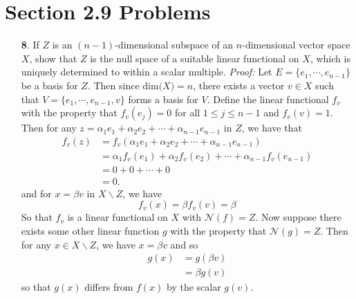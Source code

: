 \documentclass{article}
\begin{document}
\section*{Section 2.9 Problems}
\begin{itemize}
    \item[\textbf{8}.] If $Z$ is an $(n-1)$-dimensional subspace of an $n$-dimensional vector space $X$, show that $Z$ is the null space of a suitable linear functional on $X$, which is uniquely determined to within a scalar multiple.
    \newline\newline
    \textit{Proof:} Let $E = \{e_1,\cdots,e_{n-1}\}$ be a basis for $Z$. Then since $\text{dim(}X\text{)} = n$, there exists a vector $v \in X$ such that $V = \{e_1, \cdots, e_{n-1}, v\}$ forms a basis for $V$. Define the linear functional $f_v$ with the property that $f_v(e_j) = 0$ for all $1 \leq j \leq n-1$ and $f_v(v) = 1$. Then for any $z = \alpha_1e_1 + \alpha_2e_2 + \cdots + \alpha_{n-1}e_{n-1}$ in $Z$, we have that 
    \begin{align*}
        f_v(z) &= f_v(\alpha_1e_1 + \alpha_2e_2 + \cdots + \alpha_{n-1}e_{n-1})\\
        &= \alpha_1f_v(e_1) + \alpha_2f_v(e_2) + \cdots + \alpha_{n-1}f_v(e_{n-1})\\
        &= 0 + 0 + \cdots + 0\\
        &= 0.
    \end{align*}
    and for $x = \beta v$ in $X\backslash Z$, we have
    \[f_v(x) = \beta f_v(v) = \beta\]
    So that $f_v$ is a linear functional on $X$ with $\mathcal{N}(f) = Z$. Now suppose there exists some other linear function $g$ with the property that $\mathcal{N}(g) = Z$. Then for any $x \in X\backslash Z$, we have $x = \beta v$ and so
    \begin{align*}
        g(x) &= g(\beta v)\\
        &= \beta g(v)
    \end{align*}
    so that $g(x)$ differs from $f(x)$ by the scalar $g(v)$.



\end{itemize}
\end{document}
